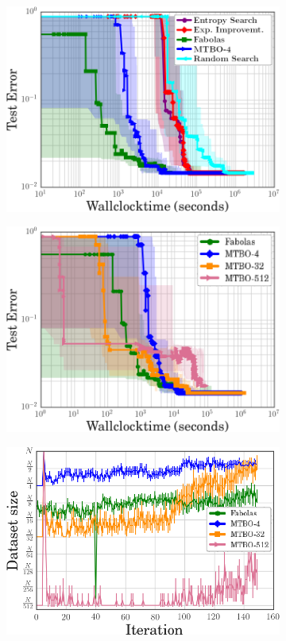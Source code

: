\begin{figure}
	\begin{subfigure}[b]{0.32\textwidth}
		\centering
		\includegraphics[width=\linewidth]{gfx/fabolas/time1.png}
	\end{subfigure}
	\begin{subfigure}[b]{0.32\textwidth}
		\centering
		\includegraphics[width=\linewidth]{gfx/fabolas/time2.png}
	\end{subfigure}
	\begin{subfigure}[b]{0.34\textwidth}
		\centering
		\includegraphics[width=\linewidth]{gfx/fabolas/size.png}

\end{subfigure}
\end{figure}
